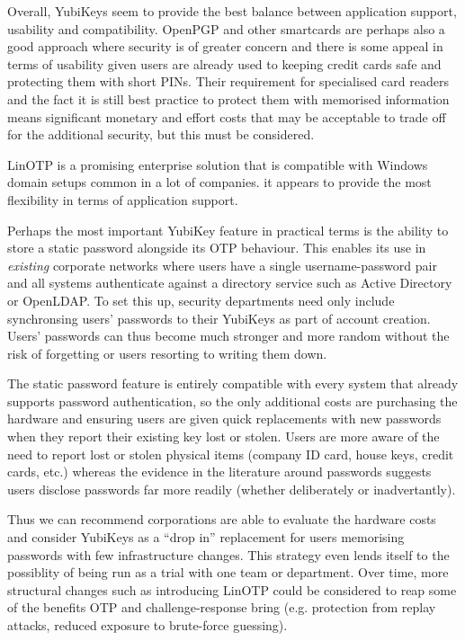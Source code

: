 \documentclass{report}
\begin{document}
Overall, YubiKeys seem to provide the best balance between application support,
usability and compatibility. OpenPGP and other smartcards are perhaps also
a good approach where security is of greater concern and there is some appeal
in terms of usability given users are already used to keeping credit cards
safe and protecting them with short PINs. Their requirement for specialised
card readers and the fact it is still best practice to protect them with memorised
information means significant monetary and effort costs that may be acceptable
to trade off for the additional security, but this must be considered.

LinOTP is a promising enterprise solution that is compatible with Windows
domain setups common in a lot of companies. it appears to provide the most
flexibility in terms of application support.

Perhaps the most important YubiKey feature in practical terms is the ability
to store a static password alongside its OTP behaviour. This enables its
use in \emph{existing} corporate networks where users have a single username-password
pair and all systems authenticate against a directory service such as Active Directory
or OpenLDAP. To set this up, security departments need only include synchronsing
users' passwords to their YubiKeys as part of account creation. Users' passwords
can thus become much stronger and more random without the risk of forgetting or
users resorting to writing them down.

The static password feature is entirely compatible with every system that already
supports password authentication, so the only additional costs are purchasing
the hardware and ensuring users are given quick replacements with new passwords
when they report their existing key lost or stolen. Users are more aware of the
need to report lost or stolen physical items (company ID card, house keys, credit cards, etc.)
whereas the evidence in the literature around passwords suggests users disclose
passwords far more readily (whether deliberately or inadvertantly).

Thus we can recommend corporations are able to evaluate the hardware costs
and consider YubiKeys as a ``drop in'' replacement for users memorising
passwords with few infrastructure changes. This strategy even lends itself
to the possiblity of being run as a trial with one team or department. Over time,
more structural changes such as introducing LinOTP could be considered to
reap some of the benefits OTP and challenge-response bring (e.g. protection
from replay attacks, reduced exposure to brute-force guessing).
\end{document}
